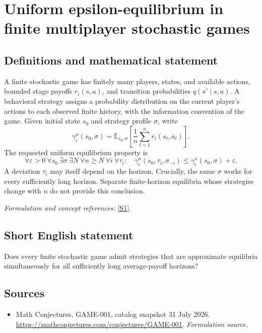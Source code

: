 \documentclass[11pt]{article}
\begin{document}
\section*{\texorpdfstring{Uniform epsilon-equilibrium in finite multiplayer stochastic games}{Uniform epsilon-equilibrium in finite multiplayer stochastic games}}\label{statement}
\subsection{Definitions and mathematical statement}
A finite stochastic game has finitely many players, states, and available actions, bounded stage payoffs $r_i(s,a)$, and transition probabilities $q(s'\mid s,a)$. A behavioral strategy assigns a probability distribution on the current player's actions to each observed finite history, with the information convention of the game. Given initial state $s_0$ and strategy profile $\sigma$, write
\[
 \gamma_i^n(s_0,\sigma)={\mathbb{E}}_{s_0,\sigma}
 \left[\frac1n\sum_{t=1}^n r_i(s_t,a_t)\right].
\]
The requested uniform equilibrium property is
\[
 \forall{\varepsilon}>0\ \forall s_0\ \exists\sigma\ \exists N\
 \forall n\ge N\ \forall i\ \forall\tau_i:\quad
 \gamma_i^n(s_0,\tau_i,\sigma_{-i})
 \le\gamma_i^n(s_0,\sigma)+{\varepsilon}.
\]
A deviation $\tau_i$ may itself depend on the horizon. Crucially, the same $\sigma$ works for every sufficiently long horizon. Separate finite-horizon equilibria whose strategies change with $n$ do not provide this conclusion.
\par\smallskip\textit{Formulation and concept references:} \href{https://mathconjectures.com/conjectures/GAME-001}{[S1]}.

\subsection{Short English statement}
Does every finite stochastic game admit strategies that are approximate equilibria simultaneously for all sufficiently long average-payoff horizons?
\subsection{Sources}
\begin{itemize}
\item[S1]Math Conjectures, GAME-001, catalog snapshot 31 July 2026.
\url{https://mathconjectures.com/conjectures/GAME-001}.
\textit{Formulation source.}
\end{itemize}
\end{document}
